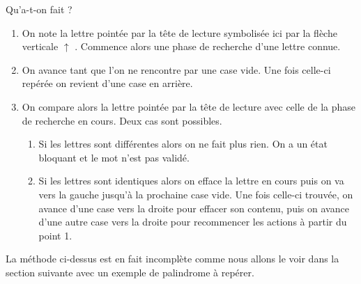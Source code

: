 Qu'a-t-on fait ?
\begin{enumerate}
	\item On note la lettre pointée par la tête de lecture symbolisée ici par la flèche verticale $\uparrow$ .
	      Commence alors une phase de recherche d'une lettre connue.

	\item On avance tant que l'on ne rencontre par une case vide. Une fois celle-ci repérée on revient d'une case en arrière.
	
	\item On compare alors la lettre pointée par la tête de lecture avec celle de la phase de recherche en cours. Deux cas sont possibles.
	\begin{enumerate}
		\item Si les lettres sont différentes alors on ne fait plus rien. 
		      On a un état bloquant et le mot n'est pas validé.

		\item Si les lettres sont identiques alors on efface la lettre en cours puis on va vers la gauche jusqu'à la prochaine case vide. 
		      Une fois celle-ci trouvée, on avance d'une case vers la droite pour effacer son contenu, puis on avance d'une autre case vers la droite pour recommencer les actions à partir du point 1.
	\end{enumerate}
\end{enumerate}


La méthode ci-dessus est en fait incomplète comme nous allons le voir dans la section suivante avec un exemple de palindrome à repérer.

